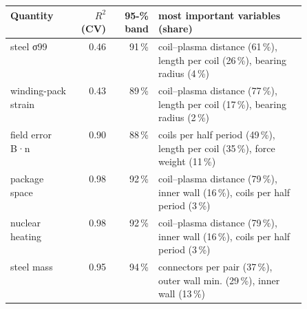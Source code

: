 \begin{tabular}{@{}lrrp{0.5\linewidth}@{}}\toprule
Quantity & $R^2$ (CV) & 95-\% band & most important variables (share) \\\midrule
steel σ99 & \num{0.46} & \num{91}\,\% & coil–plasma distance (\num{61}\,\%), length per coil (\num{26}\,\%), bearing radius (\num{4}\,\%) \\
winding-pack strain & \num{0.43} & \num{89}\,\% & coil–plasma distance (\num{77}\,\%), length per coil (\num{17}\,\%), bearing radius (\num{2}\,\%) \\
field error B·n & \num{0.90} & \num{88}\,\% & coils per half period (\num{49}\,\%), length per coil (\num{35}\,\%), force weight (\num{11}\,\%) \\
package space & \num{0.98} & \num{92}\,\% & coil–plasma distance (\num{79}\,\%), inner wall (\num{16}\,\%), coils per half period (\num{3}\,\%) \\
nuclear heating & \num{0.98} & \num{92}\,\% & coil–plasma distance (\num{79}\,\%), inner wall (\num{16}\,\%), coils per half period (\num{3}\,\%) \\
steel mass & \num{0.95} & \num{94}\,\% & connectors per pair (\num{37}\,\%), outer wall min. (\num{29}\,\%), inner wall (\num{13}\,\%) \\
\bottomrule\end{tabular}
